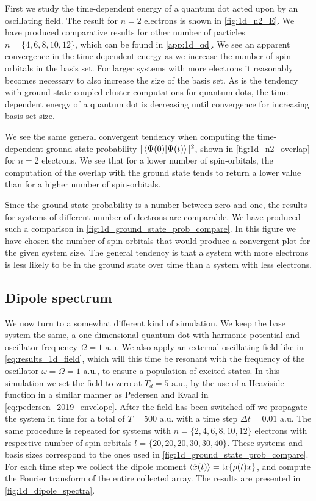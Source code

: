 First we study the time-dependent energy of a quantum dot acted upon by an oscillating 
field. The result for $n=2$ electrons is shown in \autoref{fig:1d_n2_E}. We have 
produced comparative results for other number of particles $n=\{4,6,8,10,12\}$,
which can be found in \autoref{app:1d_qd}. We see an apparent convergence in the 
time-dependent energy as we increase the number of spin-orbitals in the basis set.
For larger systems with more electrons it reasonably becomes necessary to also increase
the size of the basis set. As is the tendency with ground state coupled cluster computations
for quantum dots\cite{jorgensen2011many,lohne2010coupled}, the time dependent energy 
of a quantum dot is decreasing until convergence for increasing basis set size.

We see the same general convergent tendency when computing the time-dependent ground 
state probability $|\braket{\Psi(0)}{\Psi(t)}|^2$, shown in \autoref{fig:1d_n2_overlap} for $n=2$ electrons. We see that 
for a lower number of spin-orbitals, the computation of the overlap with 
the ground state tends to return a lower value than for a higher number of spin-orbitals.

Since the ground state probability is a number between zero and one, the results for systems 
of different number of electrons are comparable. We have produced such a comparison in 
\autoref{fig:1d_ground_state_prob_compare}. In this figure we have chosen the number of
spin-orbitals that would produce a convergent plot for the given system size. The general 
tendency is that a system with more electrons is less likely to be in the ground state 
over time than a system with less electrons.

\subsection{Dipole spectrum}

We now turn to a somewhat different kind of simulation. We keep the 
base system the same, a one-dimensional quantum dot with harmonic potential and oscillator 
frequency $\Omega=1 \text{ a.u.}$ We also apply an external oscillating field like in
\autoref{eq:results_1d_field}, which will this time be resonant with the frequency of the 
oscillator $\omega=\Omega=1 \text{ a.u.}$, to ensure a population of excited states. In this simulation 
we set the field to zero at $T_d = 5 \text{ a.u.}$, by the use of a Heaviside function in a 
similar manner as Pedersen and Kvaal \cite{pedersen2019symplectic}
in \autoref{eq:pedersen_2019_envelope}. After the field has been switched off we propagate 
the system in time for a total of $T = 500 \text{ a.u.}$ with a time step
$\Delta t=0.01 \text{ a.u.}$
The same procedure is repeated for systems with $n=\{2,4,6,8,10,12\}$ electrons with 
respective number of spin-orbitals $l=\{20,20,20,30,30,40\}$. These systems and basis 
sizes correspond to the ones used in \autoref{fig:1d_ground_state_prob_compare}.
For each time step we collect the dipole moment $\ev{\hat{x}(t)} = \tr{\rho(t) x}$,
and compute the 
Fourier transform of the entire collected array. The results are presented in 
\autoref{fig:1d_dipole_spectra}.

